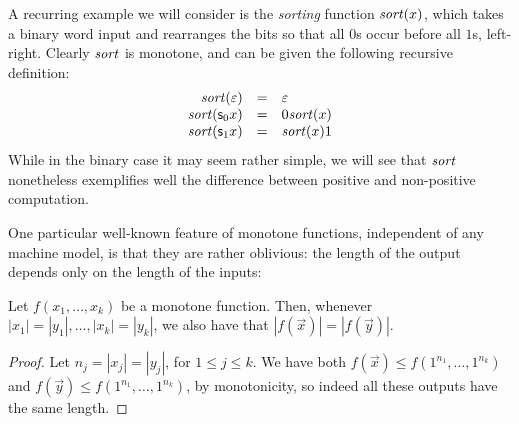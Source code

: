\documentclass{lmcs}
\begin{document}
\begin{example}
	A recurring example we will consider is the \emph{sorting} function $\mathit{sort}(x)$, which takes a binary word input and rearranges the bits so that all $0$s occur before all $1$s, left-right.
	Clearly $\mathit{sort}$ is monotone, and can be given the following recursive definition:
\begin{equation}
\label{eqn:sort-non-pos-prog}
	\begin{array}{rcl}
\mathit{sort} (\varepsilon) & = & \varepsilon \\
\mathit{sort} (\mathsf s_{0} x) & = &  0\mathit{sort}(x) \\
\mathit{sort} (\mathsf s_{1} x) & = & \mathit{sort}(x)1 
\end{array}
\end{equation}
	While in the binary case it may seem rather simple, we will see that $\mathit{sort}$ nonetheless exemplifies well the difference between positive and non-positive computation.
\end{example}


One particular well-known feature of monotone functions, independent of any machine model, is that they are rather oblivious: the length of the output depends only on the length of the inputs:

\begin{observation}
	\label{prop:length-obliv}
	Let $f(x_1, \dots, x_k)$ be a monotone function. 
	Then, whenever $|x_1| = |y_1|, \dots , |x_k| = |y_k|$, we also have that $|f(\vec x)| = |f(\vec y)|$.
\end{observation}

\begin{proof}
	Let $n_j = |x_j| = |y_j|$, for $1 \leq j\leq k$.
	We have both $f(\vec x) \leq f (1^{n_1}, \dots , 1^{n_k})$ and $f(\vec y) \leq f (1^{n_1}, \dots , 1^{n_k})$, by monotonicity, so indeed all these outputs have the same length.
\end{proof}
\end{document}
